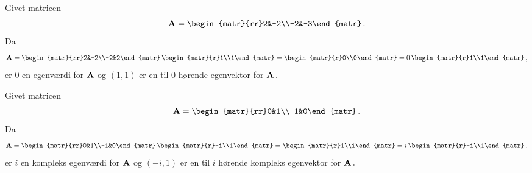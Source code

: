 \begin{example}
Givet matricen
\begin{equation*}\mA=\begin{matr}{rr}2&-2\\-2&-3\end{matr}\,.\end{equation*}
Da
\begin{equation*}\mA=\begin{matr}{rr}2&-2\\-2&2\end{matr}\,
\begin{matr}{r}1\\1\end{matr}
=\begin{matr}{r}0\\0\end{matr}
=0\,\begin{matr}{r}1\\1\end{matr}\,,
\end{equation*}
er $0$ en egenværdi for $\mathbf{A}$ og $(1,1)$ er en til $0$ hørende egenvektor for $\mathbf{A}\,.$
\end{example}

\begin{example}
Givet matricen
\begin{equation*}\mA=\begin{matr}{rr}0&1\\-1&0\end{matr}\,.\end{equation*}
Da
\begin{equation*}\mA=\begin{matr}{rr}0&1\\-1&0\end{matr}\,
\begin{matr}{r}-i\\1\end{matr}
=\begin{matr}{r}1\\i\end{matr}
=i\,\begin{matr}{r}-i\\1\end{matr}\,,
\end{equation*}
er $i$ en kompleks egenværdi for $\mathbf{A}$ og $(-i,1)$ er en til $i$ hørende kompleks egenvektor for $\mathbf{A}\,.$
\end{example}

